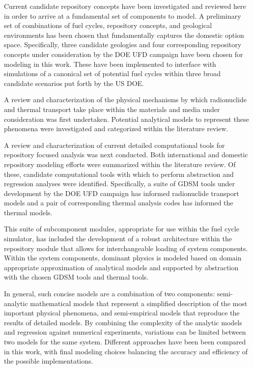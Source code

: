 Current candidate repository concepts have been investigated and reviewed here 
in order to arrive at a fundamental set of components to model. A preliminary 
set of combinations of fuel cycles, repository concepts, and geological 
environments has 
been chosen that fundamentally captures the domestic option space. 
Specifically, three candidate geologies and four corresponding repository 
concepts under consideration by the \gls{DOE} \gls{UFD} campaign have been 
chosen for modeling in this work. These have been implemented to interface
with \Cyclus simulations of a canonical set of potential fuel cycles within 
three broad candidate scenarios put forth by the \gls{US} \gls{DOE}.



A review and characterization of the physical mechanisms by which radionuclide 
and thermal transport take place within the materials and media under 
consideration was first undertaken. Potential analytical models to represent  
these phenomena were investigated and categorized within the literature review. 


A review and characterization of current detailed computational tools for
repository focused analysis was next conducted. Both international and domestic
repository modeling efforts were summarized within the literature review. Of 
these, candidate computational tools with which to perform abstraction and 
regression analyses were identified. Specifically, a suite of \gls{GDSM} tools 
under development by the \gls{DOE} \gls{UFD} campaign has informed radionuclide 
transport models and a pair of corresponding thermal analysis codes has 
informed the thermal models.
 

This suite of subcomponent modules, appropriate for use within the \Cyclus fuel 
cycle simulator, has included the development of a robust architecture 
within the repository module that allows for interchangeable loading of 
system components.  Within the system components, dominant physics is 
modeled based on domain appropriate approximation of analytical models and 
supported by abstraction with the chosen \gls{GDSM} tools and thermal tools. 


In general, such concise models are a combination of two components: 
semi-analytic mathematical models that represent a simplified description of 
the most important physical phenomena, and semi-empirical models that reproduce 
the results of detailed models.  By combining the complexity of the analytic 
models and regression against numerical experiments, variations can be limited 
between two models for the same system.  Different approaches have been been 
compared in this work, with final modeling choices balancing the accuracy and 
efficiency of the possible implementations.  

